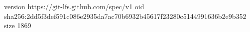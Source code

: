 version https://git-lfs.github.com/spec/v1
oid sha256:2dd5f3def591c086e2935da7ac70b6932b45617f23280c5144991636b2e9b352
size 1869
